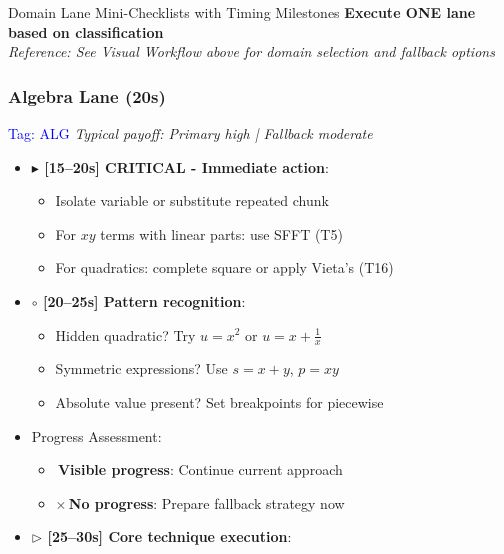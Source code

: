 \documentclass{article}
\begin{document}
\begin{classifybox}{Domain Lane Mini-Checklists with Timing Milestones}
   {\footnotesize\textcolor{timegreen}{}}\quad\textbf{Execute ONE lane based on classification}\\
   \textit{Reference: See Visual Workflow above for domain selection and fallback options}\\
   \vspace{2mm}
   
     \subsubsection{Algebra Lane (20s)}
     {\footnotesize\textcolor{timegreen}{}}\quad\textcolor{blue}{Tag: ALG}
      \textit{Typical payoff: Primary high | Fallback moderate}
      \begin{itemize}[nosep]
      \item \textbf{$\blacktriangleright$ [15--20s] CRITICAL - Immediate action}: 
        \begin{itemize}[nosep]
        \item Isolate variable or substitute repeated chunk
        \item For $xy$ terms with linear parts: use SFFT (T5)
        \item For quadratics: complete square or apply Vieta's (T16)
        \end{itemize}
      \item \textbf{$\circ$ [20--25s] Pattern recognition}:
        \begin{itemize}[nosep]
        \item Hidden quadratic? Try $u=x^2$ or $u=x+\tfrac{1}{x}$
        \item Symmetric expressions? Use $s=x+y$, $p=xy$
        \item Absolute value present? Set breakpoints for piecewise
        \end{itemize}
      \item {} Progress Assessment:
        \begin{itemize}[nosep]
        \item \checkmark\,\textbf{Visible progress}: Continue current approach
        \item $\times$\,\textbf{No progress}: Prepare fallback strategy now
        \end{itemize}
      \item \textbf{$\triangleright$ [25--30s] Core technique execution}:

\end{itemize}
\end{classifybox}
\end{document}
